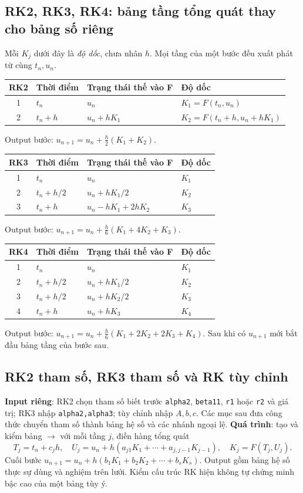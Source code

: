 \subsection{RK2, RK3, RK4: bảng tầng tổng quát thay cho bảng số riêng}
Mỗi $K_j$ dưới đây là \emph{độ dốc}, chưa nhân $h$. Mọi tầng của một bước đều xuất phát từ cùng $t_n,u_n$.
\begin{center}\small\begin{tabular}{clll}\toprule
RK2&Thời điểm&Trạng thái thế vào F&Độ dốc\\\midrule
1&$t_n$&$u_n$&$K_1=F(t_n,u_n)$\\
2&$t_n+h$&$u_n+hK_1$&$K_2=F(t_n+h,u_n+hK_1)$\\\bottomrule
\end{tabular}\end{center}
Output bước: $u_{n+1}=u_n+\frac h2(K_1+K_2)$.
\begin{center}\small\begin{tabular}{clll}\toprule
RK3&Thời điểm&Trạng thái thế vào F&Độ dốc\\\midrule
1&$t_n$&$u_n$&$K_1$\\
2&$t_n+h/2$&$u_n+hK_1/2$&$K_2$\\
3&$t_n+h$&$u_n-hK_1+2hK_2$&$K_3$\\\bottomrule
\end{tabular}\end{center}
Output bước: $u_{n+1}=u_n+\frac h6(K_1+4K_2+K_3)$.
\begin{center}\small\begin{tabular}{clll}\toprule
RK4&Thời điểm&Trạng thái thế vào F&Độ dốc\\\midrule
1&$t_n$&$u_n$&$K_1$\\
2&$t_n+h/2$&$u_n+hK_1/2$&$K_2$\\
3&$t_n+h/2$&$u_n+hK_2/2$&$K_3$\\
4&$t_n+h$&$u_n+hK_3$&$K_4$\\\bottomrule
\end{tabular}\end{center}
Output bước: $u_{n+1}=u_n+\frac h6(K_1+2K_2+2K_3+K_4)$. Sau khi có $u_{n+1}$ mới bắt đầu bảng tầng của bước sau.

\subsection{RK2 tham số, RK3 tham số và RK tùy chỉnh}
\textbf{Input riêng}: RK2 chọn tham số biết trước \texttt{alpha2}, \texttt{beta11}, \texttt{r1} hoặc \texttt{r2} và giá trị; RK3 nhập \texttt{alpha2,alpha3}; tùy chỉnh nhập $A,b,c$. Các mục sau đưa công thức chuyển tham số thành bảng hệ số và các nhánh ngoại lệ.
\textbf{Quá trình}: tạo và kiểm bảng $\to$ với mỗi tầng $j$, điền hàng tổng quát
\[
T_j=t_n+c_jh,\quad
U_j=u_n+h(a_{j1}K_1+\cdots+a_{j,j-1}K_{j-1}),\quad K_j=F(T_j,U_j).
\]
Cuối bước $u_{n+1}=u_n+h(b_1K_1+b_2K_2+\cdots+b_sK_s)$. Output gồm bảng hệ số thực sự dùng và nghiệm trên lưới. Kiểm cấu trúc RK hiện không tự chứng minh bậc cao của một bảng tùy ý.

